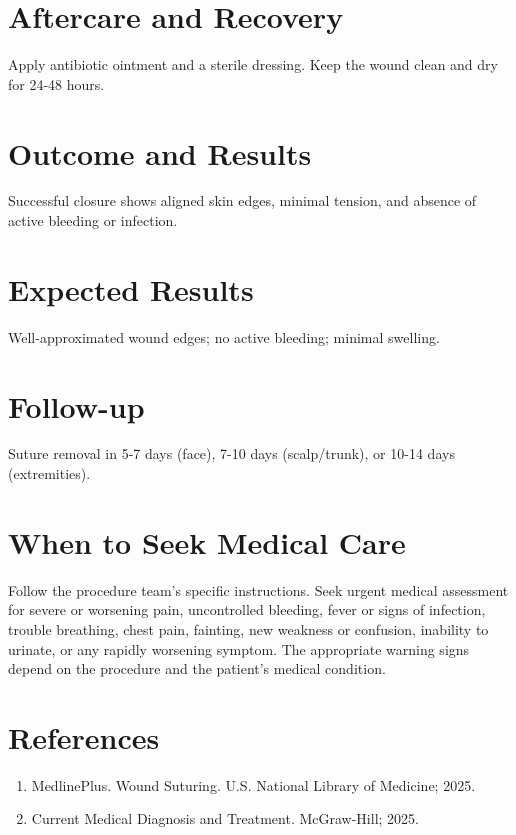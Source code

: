\section*{Aftercare and Recovery}
Apply antibiotic ointment and a sterile dressing. Keep the wound clean and dry for 24-48 hours.

\section*{Outcome and Results}
Successful closure shows aligned skin edges, minimal tension, and absence of active bleeding or infection.

\section*{Expected Results}
Well-approximated wound edges; no active bleeding; minimal swelling.

\section*{Follow-up}
Suture removal in 5-7 days (face), 7-10 days (scalp/trunk), or 10-14 days (extremities).

\section*{When to Seek Medical Care}
Follow the procedure team's specific instructions. Seek urgent medical assessment for severe or worsening pain, uncontrolled bleeding, fever or signs of infection, trouble breathing, chest pain, fainting, new weakness or confusion, inability to urinate, or any rapidly worsening symptom. The appropriate warning signs depend on the procedure and the patient's medical condition.

\section*{References}
\begin{enumerate}
  \item MedlinePlus. Wound Suturing. U.S. National Library of Medicine; 2025.
  \item Current Medical Diagnosis and Treatment. McGraw-Hill; 2025.
\end{enumerate}

\clearpage
